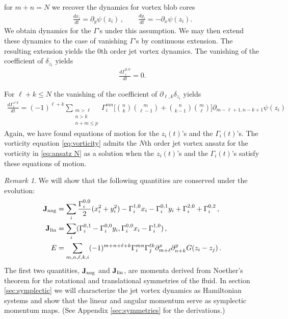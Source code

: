 \documentclass[12pt]{amsart}
\theoremstyle{remark}
\newtheorem{rmk}[thm]{Remark}
\begin{document}
for $m+n = N$ we recover the dynamics for vortex blob cores
\begin{align*}
  \frac{dx_i}{dt} = \partial_y \psi (z_i) \,,\quad  \quad \frac{dy_i}{dt} = - \partial_x \psi(z_i).
\end{align*}
We obtain dynamics for the $\Gamma$'s under this assumption.
We may then extend these dynamics to the case of vanishing $\Gamma$'s by continuous extension.
  The resulting extension yields the $0$th order
  jet vortex dynamics.
The vanishing of the coefficient of $\delta_{z_i}$ yields
\begin{align*}
	\frac{d\Gamma^{0,0}_i}{dt}  = 0.
\end{align*}

For $\ell+k \leq N$ the vanishing of the coefficient of $\partial_{\ell,k} \delta_{z_i}$ yields
\begin{align*}
 \frac{d\Gamma_i^{\ell k}}{dt} = (-1)^{\ell + k}
  \sum_{
    \substack{
      m > \ell \\
      n > k \\
      n+m \leq p}
    }\Gamma_i^{mn} \Bigg[  \binom{n}{k} \binom{m}{\ell-1} +  \binom{n}{k-1} \binom{m}{\ell} \Bigg] \partial_{m-\ell+1,n-k+1} \psi(z_i) 
\end{align*}
Again, we have found equations of motion for the $z_i(t)$'s and the $\Gamma_i(t)$'s.
The vorticity equation \eqref{eq:vorticity} admits the $N$th order jet vortex ansatz for the vorticity in \eqref{eq:ansatz N} as a solution when the $z_i(t)$'s and the $\Gamma_i(t)$'s satisfy these equations of motion.

\begin{rmk} \label{rmk:conserved}
  We will show that the following quantities are conserved under the evolution:
  \begin{align*}
	  {\bf J}_{\rm ang} &= \sum_i \frac{\Gamma^{0,0}_i}{2} (x_i^2 + y_i^2) - \Gamma_i^{1,0} x_i - \Gamma_i^{0,1} y_i + \Gamma_i^{2,0} + \Gamma_i^{0,2} \,, \\
	  {\bf J}_{\rm lin} &= \sum_i ( \Gamma_i^{0,1} - \Gamma^{0,0}_i y_i , \Gamma^{0,0}_i x_i -\Gamma^{1,0}_i ) \,, \\
	  E &= \sum_{m,n,\ell,k,i} (-1)^{m+n+\ell +k} \Gamma^{mn}_i \Gamma_j^{\ell k} \partial_{m+\ell}^x \partial_{n+k}^y G(z_i-z_j)\,.
  \end{align*}
  The first two quantities, ${\bf J}_{\rm ang}$ and ${\bf J}_{\rm lin}$, are momenta derived from Noether's theorem for the rotational and translational symmetries of the fluid.
  In section \ref{sec:symplectic} we will characterize the jet vortex dynamics as Hamiltonian systems and show that the linear and angular momentum serve as symplectic momentum maps. (See Appendix \ref{sec:symmetries} for the derivations.)
\end{rmk}
\end{document}
